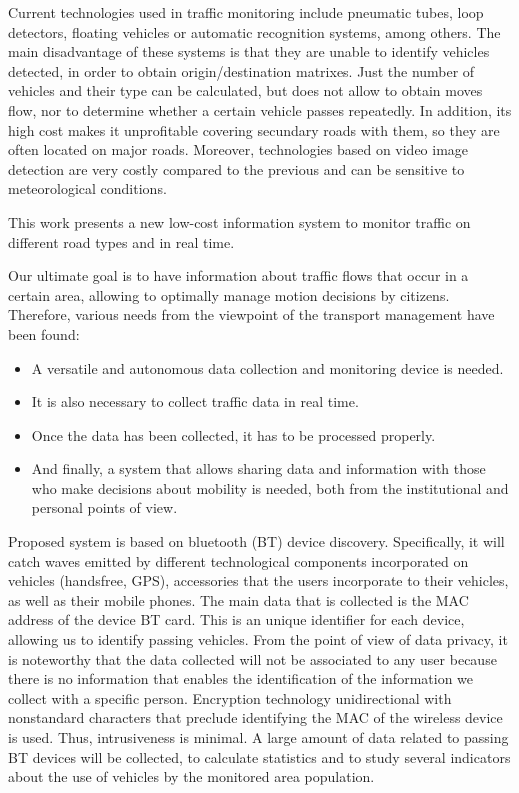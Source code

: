 \documentclass{llncs}
\begin{document}
Current technologies used in traffic monitoring include pneumatic tubes, loop detectors, floating vehicles or automatic recognition systems, among others. The main disadvantage of these systems is that they are unable to identify vehicles detected, in order to obtain origin/destination matrixes. Just the number of vehicles and their type can be calculated, but does not allow to obtain moves flow, nor to determine whether a certain vehicle passes repeatedly. In addition, its high cost makes it unprofitable covering secundary roads with them, so they are often located on major roads. Moreover, technologies based on video image detection are very costly compared to the previous and can be sensitive to meteorological conditions.

This work presents a new low-cost information system to monitor traffic on different road types and in real time.

Our ultimate goal is to have information about traffic flows that occur in a certain area, allowing to optimally manage motion decisions by citizens.
Therefore, various needs from the viewpoint of the transport management have been found:

\begin{itemize}
  \item A versatile and autonomous data collection and monitoring device is needed.
  \item It is also necessary to collect traffic data in real time.
  \item Once the data has been collected, it has to be processed properly.
  \item And finally, a system that allows sharing data and information with those who make decisions about mobility is needed, both from the institutional and personal points of view.
\end{itemize}


Proposed system is based on bluetooth (BT) device discovery. 
Specifically, it will catch waves emitted by different technological components incorporated on vehicles (handsfree, {GPS}), accessories that the users incorporate to their vehicles, as well as their mobile phones.
The main data that is collected is the MAC address of the device BT card.
This is an unique identifier for each device, allowing us to identify passing vehicles.
From the point of view of data privacy, it is noteworthy that the data collected will not be associated to any user because there is no information that enables the identification of the information we collect with a specific person. 
Encryption technology unidirectional with nonstandard characters that preclude identifying the MAC of the wireless device is used. Thus, intrusiveness is minimal.
A large amount of data related to passing BT devices will be collected, to calculate statistics and to study several indicators about the use of vehicles by the monitored area population.
\end{document}
